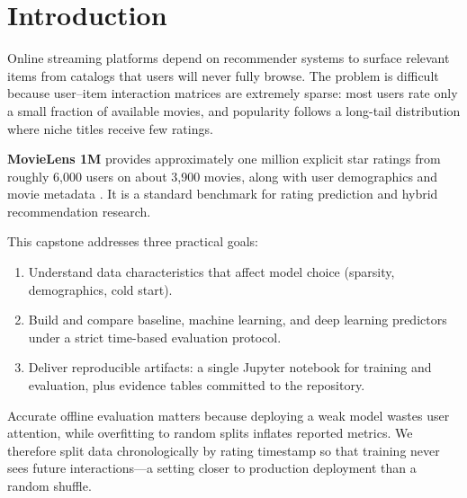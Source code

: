 \section{Introduction}

Online streaming platforms depend on recommender systems to surface relevant items from catalogs that users
will never fully browse.
The problem is difficult because user--item interaction matrices are extremely sparse: most users rate only
a small fraction of available movies, and popularity follows a long-tail distribution where niche titles
receive few ratings.

\textbf{MovieLens 1M} provides approximately one million explicit star ratings from roughly 6{,}000 users
on about 3{,}900 movies, along with user demographics and movie metadata \cite{harper2015movielens}.
It is a standard benchmark for rating prediction and hybrid recommendation research.

This capstone addresses three practical goals:
\begin{enumerate}
  \item Understand data characteristics that affect model choice (sparsity, demographics, cold start).
  \item Build and compare baseline, machine learning, and deep learning predictors under a strict
        time-based evaluation protocol.
  \item Deliver reproducible artifacts: a single Jupyter notebook for training and evaluation, plus
        evidence tables committed to the repository.
\end{enumerate}

Accurate offline evaluation matters because deploying a weak model wastes user attention, while
overfitting to random splits inflates reported metrics.
We therefore split data chronologically by rating timestamp so that training never sees future
interactions---a setting closer to production deployment than a random shuffle.
